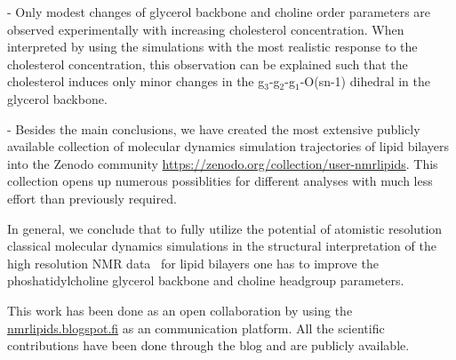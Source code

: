 \documentclass[journal=jacsat,manuscript=article]{achemso}
\begin{document}
- Only modest changes of glycerol backbone and choline order parameters are observed experimentally with increasing cholesterol concentration.
When interpreted by using the simulations with the most realistic response to the cholesterol concentration,
this observation can be explained such that the cholesterol induces only minor changes in the g$_3$-g$_2$-g$_1$-O(sn-1)
dihedral in the glycerol backbone.


- Besides the main conclusions, we have created the most extensive
publicly available collection of molecular dynamics simulation trajectories of lipid bilayers
into the Zenodo community \url{https://zenodo.org/collection/user-nmrlipids}. 
This collection opens up numerous possiblities for different analyses with
much less effort than previously required.

In general, we conclude that to fully utilize the potential of atomistic resolution classical molecular dynamics simulations
in the structural interpretation of the high resolution NMR data~\cite{ferreira14} for lipid bilayers one has to  
improve the phoshatidylcholine glycerol backbone and choline headgroup parameters.

This work has been done as an open collaboration by using the \url{nmrlipids.blogspot.fi} as an communication
platform. All the scientific contributions have been done through the blog and are publicly
available.  



\end{document}
